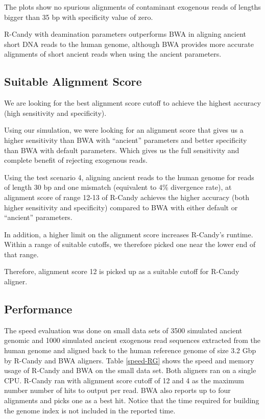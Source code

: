 \documentclass[11pt,a4paper]{report}
\newcommand{\quotes}[1]{``#1''}
\begin{document}
The plots show no spurious alignments of contaminant exogenous reads of lengths 
bigger than 35 bp with specificity value of zero.

R-Candy with deamination parameters outperforms BWA in aligning ancient short DNA
reads to the human genome, although BWA provides more accurate alignments of short 
ancient reads when using the ancient parameters. 
 



\subsection{Suitable Alignment Score} 
\label{Suitable Alignment Score}

We are looking for the best alignment score cutoff to achieve the 
highest accuracy (high sensitivity and specificity).

Using our simulation, we were looking for an alignment score that 
gives us a higher sensitivity than BWA with \quotes{ancient} parameters 
and better specificity than BWA with default parameters.
Which gives us the full sensitivity and complete benefit of rejecting
exogenous reads. 

Using the test scenario 4, aligning ancient reads to the human
genome for reads of length 30 bp and one mismatch (equivalent to 4\% 
divergence rate), at alignment score of range 12-13 of R-Candy 
achieves the higher accuracy (both higher sensitivity and 
specificity) compared to BWA with either default or \quotes{ancient} 
parameters.

In addition, a higher limit on the alignment score increases R-Candy's runtime.
Within a range of suitable cutoffs, we therefore picked one near the lower end
of that range.

Therefore, alignment score 12 is picked up as a suitable cutoff for R-Candy 
aligner. 


\subsection{Performance} \label{Performance}

The speed evaluation was done on small data sets of 3500 simulated ancient 
genomic and 1000 simulated ancient exogenous read sequences extracted from
the human genome and aligned back to the human reference genome of size 3.2 
Gbp by R-Candy and BWA aligners.
Table \ref{speed-RG} shows the speed and memory usage of R-Candy and BWA on 
the small data set. Both aligners ran on a single CPU. 
R-Candy ran with alignment score cutoff of 12 and 4 as the maximum
number number of hits to output per read. BWA also reports up to four
alignments and picks one as a best hit.  Notice that the time required for
building the genome index is not included in the reported time.\\
\end{document}
